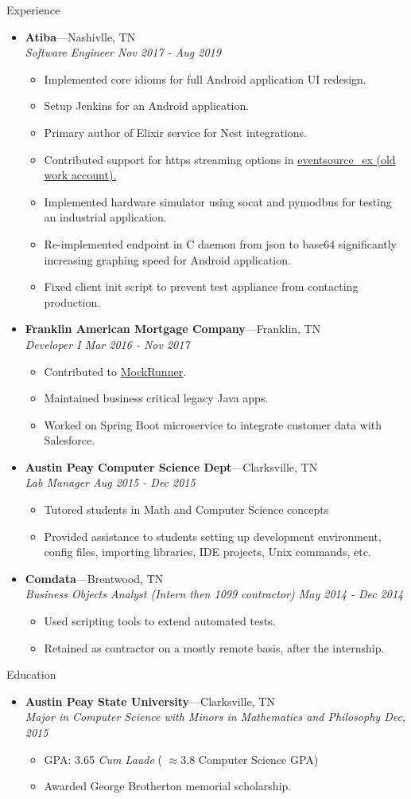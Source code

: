 \documentclass[11pt,oneside]{article}
\newenvironment{ressection}[1]{
	\vspace{4pt}
	{\fontfamily{phv}\selectfont\Large#1}
	\begin{itemize}
	\vspace{3pt}
}{
	\end{itemize}
}
\newcommand{\ressubitem}[1]{
	\vspace{-1pt}
	\item \begin{flushleft} #1 \end{flushleft}
}
\newcommand{\resbigitem}[3]{
	\vspace{-5pt}
	\item
	\textbf{#1}---#2 \\
	\textit{#3}
}
\newenvironment{ressubsec}[3]{
	\resbigitem{#1}{#2}{#3}
	\vspace{-2pt}
	\begin{itemize}
}{
	\end{itemize}
}
\begin{document}
\begin{ressection}{Experience}
        \begin{ressubsec}{Atiba}{Nashivlle, TN}{Software Engineer Nov 2017 - Aug 2019}
		\ressubitem{Implemented core idioms for full Android application UI redesign.}
		\ressubitem{Setup Jenkins for an Android application.}
		\ressubitem{Primary author of Elixir service for Nest integrations.}
        \ressubitem{Contributed support for https streaming options in \href{https://github.com/cwc/eventsource_ex/pull/10/files}{eventsource\_ex (old work account).}}
        \ressubitem{Implemented hardware simulator using socat and pymodbus for testing an industrial application.}
        \ressubitem{Re-implemented endpoint in C daemon from json to base64 significantly increasing graphing speed for Android application.}
		\ressubitem{Fixed client init script to prevent test appliance from contacting production.}
	\end{ressubsec}

			\begin{ressubsec}{Franklin American Mortgage Company}{Franklin, TN}{Developer I Mar 2016 - Nov 2017}
                    \ressubitem{Contributed to \href{https://github.com/mockrunner/mockrunner/pull/42}{MockRunner}.}
		\ressubitem{Maintained business critical legacy Java apps.}
		\ressubitem{Worked on Spring Boot microservice to integrate customer data with Salesforce.}
	\end{ressubsec}


	\begin{ressubsec}{Austin Peay Computer Science Dept}{Clarksville, TN}{Lab Manager Aug 2015 - Dec 2015}
		\ressubitem{Tutored students in Math and Computer Science concepts}
		\ressubitem{Provided assistance to students setting up development environment, config files, importing libraries, IDE projects, Unix commands, etc.}
	\end{ressubsec}

	\begin{ressubsec}{Comdata}{Brentwood, TN}{Business Objects Analyst (Intern then 1099 contractor) May 2014 - Dec 2014}
    \ressubitem{Used scripting tools to extend automated tests.}
    \ressubitem{Retained as contractor on a mostly remote basis, after the internship.}
	\end{ressubsec}

\end{ressection}

\begin{ressection}{Education}

	\begin{ressubsec}{Austin Peay State University}{Clarksville, TN}{Major in Computer Science with Minors in Mathematics and Philosophy Dec, 2015}
		\ressubitem{GPA: 3.65 \textit{Cum Laude} ( $\approx 3.8$ Computer Science GPA)}
		\ressubitem{Awarded George Brotherton memorial scholarship.}
	\end{ressubsec}
\end{ressection}
\end{document}
